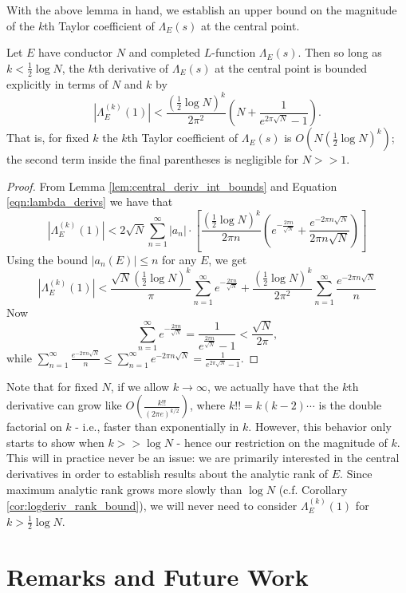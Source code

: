 \documentclass[10pt]{article}
\newcommand{\Lams}{\Lambda_E(s)}
\begin{document}
With the above lemma in hand, we establish an upper bound on the magnitude of the $k$th Taylor coefficient of $\Lams$ at the central point.
\begin{proposition}\label{prop:central_deriv_bounds}
Let $E$ have conductor $N$ and completed $L$-function $\Lams$. Then so long as $k<\frac{1}{2}\log N$, the $k$th derivative of $\Lams$ at the central point is bounded explicitly in terms of $N$ and $k$ by
\begin{equation}
\left| \Lambda_E^{(k)}(1)\right| < \frac{(\frac{1}{2}\log N)^k}{2\pi^2}\left(N + \frac{1}{e^{2\pi\sqrt{N}}-1} \right).
\end{equation}
That is, for fixed $k$ the $k$th Taylor coefficient of $\Lams$ is $O\left( N(\frac{1}{2}\log N)^k\right)$; the second term inside the final parentheses is negligible for $N>>1$.
\end{proposition}

\begin{proof}
From Lemma \ref{lem:central_deriv_int_bounds} and Equation \ref{eqn:lambda_derivs} we have that
\begin{equation*}
\left| \Lambda_E^{(k)}(1)\right| < 2 \sqrt{N} \sum_{n=1}^{\infty} |a_n| \cdot \left[\frac{\left(\frac{1}{2} \log N\right)^{k}}{2\pi n}\left( e^{-\frac{2\pi n}{\sqrt{N}}} + \frac{e^{-2\pi n\sqrt{N}}}{2\pi n \sqrt N} \right)\right]
\end{equation*}
Using the bound $|a_n(E)| \le n$ for any $E$, we get
\begin{equation*}
\left| \Lambda_E^{(k)}(1)\right| < \frac{ \sqrt{N}\left(\frac{1}{2} \log N\right)^{k}}{\pi} \sum_{n=1}^{\infty} e^{-\frac{2\pi n}{\sqrt{N}}} + \frac{\left(\frac{1}{2} \log N\right)^{k}}{2\pi^2} \sum_{n=1}^{\infty} \frac{e^{-2\pi n\sqrt{N}}}{n}
\end{equation*}
Now
\begin{equation*}
\sum_{n=1}^{\infty} e^{-\frac{2\pi n}{\sqrt{N}}} = \frac{1}{e^{\frac{2\pi n}{\sqrt{N}}}-1}< \frac{\sqrt{N}}{2\pi},
\end{equation*}
while $\sum_{n=1}^{\infty} \frac{e^{-2\pi n\sqrt{N}}}{n} \le \sum_{n=1}^{\infty} e^{-2\pi n\sqrt{N}} = \frac{1}{e^{2\pi\sqrt{N}}-1}$.
\end{proof}

Note that for fixed $N$, if we allow $k \to \infty$, we actually have that the $k$th derivative can grow like $O\left(\frac{k!!}{(2\pi e)^{k/2}}\right)$, where $k!! = k(k-2)\cdots$ is the double factorial on $k$ - i.e., faster than exponentially in $k$. However, this behavior only starts to show when $k>>\log N$ - hence our restriction on the magnitude of $k$. This will in practice never be an issue: we are primarily interested in the central derivatives in order to establish results about the analytic rank of $E$. Since maximum analytic rank grows more slowly than $\log N$ (c.f. Corollary \ref{cor:logderiv_rank_bound}), we will never need to consider $\Lambda_E^{(k)}(1)$ for $k> \frac{1}{2}\log N$.



\newpage
\section{Remarks and Future Work}



\newpage
{}

\end{document}
